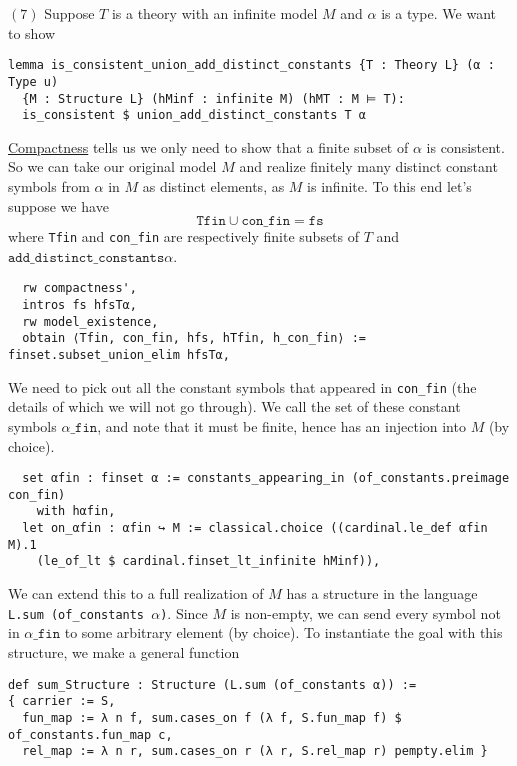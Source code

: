 \documentclass{article}
\newcommand{\al}{\alpha}
\newcommand{\<}{\langle}
\renewcommand{\>}{\rangle}
\newcommand{\linkto}[2]{\hyperlink{#1}{#2}}
\theoremstyle{definitionstyle}
\theoremstyle{exercisestyle}
\theoremstyle{remarkstyle}
\begin{document}
$(7)$ Suppose $T$ is a theory with an infinite model $M$ and $\al$ is a type.
We want to show

\begin{lstlisting}
lemma is_consistent_union_add_distinct_constants {T : Theory L} (α : Type u)
  {M : Structure L} (hMinf : infinite M) (hMT : M ⊨ T):
  is_consistent $ union_add_distinct_constants T α
\end{lstlisting}

\linkto{compactness_consistency}{Compactness} tells us we only
need to show that a finite subset of $\al$ is consistent.
So we can take our original model $M$ and realize finitely many
distinct constant symbols from $\al$ in $M$ as distinct elements,
as $M$ is infinite.
To this end let's suppose we have
\[\texttt{Tfin} \cup \texttt{con\_fin} = \texttt{fs}\]
where \texttt{Tfin} and \texttt{con\_fin} are respectively
finite subsets of $T$ and $\texttt{add\_distinct\_constants} \al$.

\begin{lstlisting}
  rw compactness',
  intros fs hfsTα,
  rw model_existence,
  obtain ⟨Tfin, con_fin, hfs, hTfin, h_con_fin⟩ := finset.subset_union_elim hfsTα, \end{lstlisting}

We need to pick out all the constant symbols that appeared in
\texttt{con\_fin} (the details of which we will not go through).
We call the set of these constant symbols $\al\texttt{\_fin}$,
and note that it must be finite,
hence has an injection into $M$ (by choice).

\begin{lstlisting}
  set αfin : finset α := constants_appearing_in (of_constants.preimage con_fin)
    with hαfin,
  let on_αfin : αfin ↪ M := classical.choice ((cardinal.le_def αfin M).1
    (le_of_lt $ cardinal.finset_lt_infinite hMinf)),
\end{lstlisting}

We can extend this to a full realization of $M$ has a structure in the
language \texttt{L.sum (of\_constants $\al$)}.
Since $M$ is non-empty, we can send every symbol not in $\al\texttt{\_fin}$
to some arbitrary element (by choice).
To instantiate the goal with this structure, we make a general function

\begin{lstlisting}
def sum_Structure : Structure (L.sum (of_constants α)) :=
{ carrier := S,
  fun_map := λ n f, sum.cases_on f (λ f, S.fun_map f) $ of_constants.fun_map c,
  rel_map := λ n r, sum.cases_on r (λ r, S.rel_map r) pempty.elim } \end{lstlisting}
\end{document}

